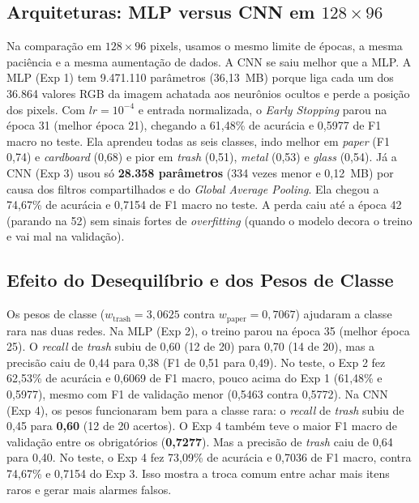 \documentclass[11pt,a4paper]{article}
\begin{document}
\subsection{Arquiteturas: MLP versus CNN em $128 \times 96$}

Na comparação em $128 \times 96$ pixels, usamos o mesmo limite de épocas, a mesma paciência e a mesma aumentação de dados. A CNN se saiu melhor que a MLP. A MLP (Exp 1) tem 9.471.110 parâmetros (36,13~MB) porque liga cada um dos 36.864 valores RGB da imagem achatada aos neurônios ocultos e perde a posição dos pixels. Com $lr = 10^{-4}$ e entrada normalizada, o \textit{Early Stopping} parou na época 31 (melhor época 21), chegando a 61,48\% de acurácia e 0,5977 de F1 macro no teste. Ela aprendeu todas as seis classes, indo melhor em \textit{paper} (F1 0,74) e \textit{cardboard} (0,68) e pior em \textit{trash} (0,51), \textit{metal} (0,53) e \textit{glass} (0,54). Já a CNN (Exp 3) usou só \textbf{28.358 parâmetros} (334 vezes menor e 0,12~MB) por causa dos filtros compartilhados e do \textit{Global Average Pooling}. Ela chegou a 74,67\% de acurácia e 0,7154 de F1 macro no teste. A perda caiu até a época 42 (parando na 52) sem sinais fortes de \textit{overfitting} (quando o modelo decora o treino e vai mal na validação).

\subsection{Efeito do Desequilíbrio e dos Pesos de Classe}

Os pesos de classe ($w_{\text{trash}} = 3{,}0625$ contra $w_{\text{paper}} = 0{,}7067$) ajudaram a classe rara nas duas redes. Na MLP (Exp 2), o treino parou na época 35 (melhor época 25). O \textit{recall} de \textit{trash} subiu de 0,60 (12 de 20) para 0,70 (14 de 20), mas a precisão caiu de 0,44 para 0,38 (F1 de 0,51 para 0,49). No teste, o Exp 2 fez 62,53\% de acurácia e 0,6069 de F1 macro, pouco acima do Exp 1 (61,48\% e 0,5977), mesmo com F1 de validação menor (0,5463 contra 0,5772). Na CNN (Exp 4), os pesos funcionaram bem para a classe rara: o \textit{recall} de \textit{trash} subiu de 0,45 para \textbf{0,60} (12 de 20 acertos). O Exp 4 também teve o maior F1 macro de validação entre os obrigatórios (\textbf{0,7277}). Mas a precisão de \textit{trash} caiu de 0,64 para 0,40. No teste, o Exp 4 fez 73,09\% de acurácia e 0,7036 de F1 macro, contra 74,67\% e 0,7154 do Exp 3. Isso mostra a troca comum entre achar mais itens raros e gerar mais alarmes falsos.
\end{document}

